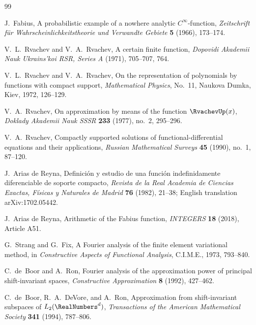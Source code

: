 \documentclass[11pt,oneside]{article}
\numberwithin{equation}{section}
\theoremstyle{definition}
\theoremstyle{remark}
\begin{document}
\begin{thebibliography}{99}

J.~Fabius,
\newblock A probabilistic example of a nowhere analytic $C^\infty$-function,
\newblock \emph{Zeitschrift f\"ur Wahrscheinlichkeitstheorie und Verwandte
Gebiete} \textbf{5} (1966), 173--174.

V.~L.~Rvachev and V.~A.~Rvachev,
\newblock A certain finite function,
\newblock \emph{Dopovidi Akademii Nauk Ukrains'koi RSR, Series A} (1971),
705--707, 764.

V.~L.~Rvachev and V.~A.~Rvachev,
\newblock On the representation of polynomials by functions with compact
support,
\newblock \emph{Mathematical Physics}, No.~11, Naukova Dumka, Kiev, 1972,
126--129.

V.~A.~Rvachev,
\newblock On approximation by means of the function $\RvachevUp(x)$,
\newblock \emph{Doklady Akademii Nauk SSSR} \textbf{233} (1977), no.~2,
295--296.

V.~A.~Rvachev,
\newblock Compactly supported solutions of functional-differential equations
and their applications,
\newblock \emph{Russian Mathematical Surveys} \textbf{45} (1990), no.~1,
87--120.

J.~Arias de Reyna,
\newblock Definici\'on y estudio de una funci\'on indefinidamente
diferenciable de soporte compacto,
\newblock \emph{Revista de la Real Academia de Ciencias Exactas, F\'isicas y
Naturales de Madrid} \textbf{76} (1982), 21--38; English translation
arXiv:1702.05442.

J.~Arias de Reyna,
\newblock Arithmetic of the Fabius function,
\newblock \emph{INTEGERS} \textbf{18} (2018), Article A51.

G.~Strang and G.~Fix,
\newblock A Fourier analysis of the finite element variational method,
\newblock in \emph{Constructive Aspects of Functional Analysis}, C.I.M.E.,
1973, 793--840.

C.~de~Boor and A.~Ron,
\newblock Fourier analysis of the approximation power of principal
shift-invariant spaces,
\newblock \emph{Constructive Approximation} \textbf{8} (1992), 427--462.

C.~de~Boor, R.~A.~DeVore, and A.~Ron,
\newblock Approximation from shift-invariant subspaces of
$L_2(\RealNumbers^d)$,
\newblock \emph{Transactions of the American Mathematical Society}
\textbf{341} (1994), 787--806.


\end{thebibliography}
\end{document}
